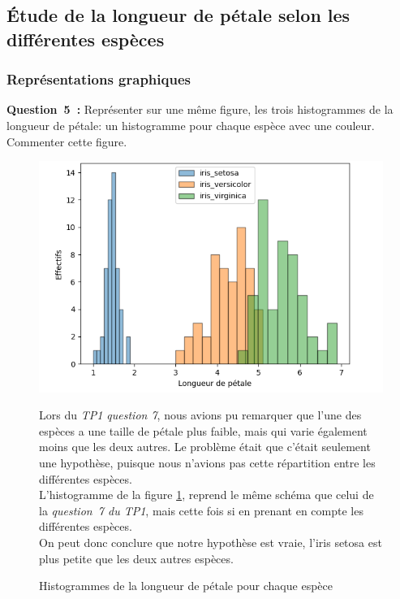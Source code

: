 \subsection{Étude de la longueur de pétale selon les différentes espèces}
\subsubsection*{Représentations graphiques}
\vspace{.2cm}

\noindent
\textbf{Question~5~:} Représenter sur une même figure, les trois histogrammes de la longueur de pétale: un
histogramme pour chaque espèce avec une couleur. Commenter cette figure.
\vspace{.2cm}

\begin{figure}[!h]
    \centering
    \begin{minipage}{.48\linewidth}
        \begin{center}
            \includegraphics[width=1\textwidth]{img/Figure_3.png}
            \caption{\label{fig:figure3}Histogrammes de la longueur de pétale pour chaque espèce}
        \end{center}
    \end{minipage}\hfill
    \begin{minipage}{.48\linewidth}
        Lors du \textit{TP1 question 7}, nous avions pu remarquer que l'une des espèces a une taille de pétale plus faible, mais qui varie également moins que les deux autres. Le problème était que c'était seulement une hypothèse, puisque nous n'avions pas cette répartition 
        entre les différentes espèces. \\
        L'histogramme de la figure \ref*{fig:figure3}, reprend le même schéma que celui de la \textit{question~7 du TP1}, mais cette fois si en prenant en compte les différentes espèces. \\
        On peut donc conclure que notre hypothèse est vraie, l'iris setosa est plus petite que les deux autres espèces.
    \end{minipage}
\end{figure}

